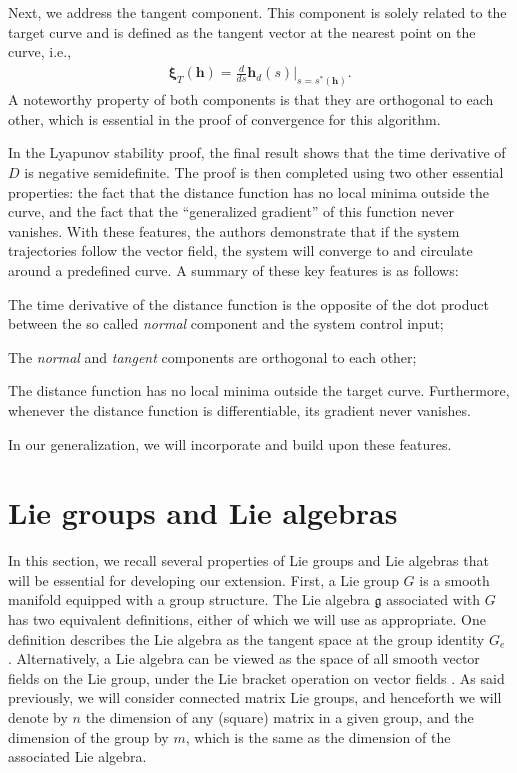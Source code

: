 Next, we address the tangent component. This component is solely related to the target curve and is defined as the tangent vector at the nearest point on the curve, i.e.,
\begin{align}
    \boldsymbol{\xi}_{T}(\mathbf{h}) = \frac{d}{ds}\mathbf{h}_d(s)|_{s=s^*(\mathbf{h})}.
\end{align}
A noteworthy property of both components is that they are orthogonal to each other, which is essential in the proof of convergence for this algorithm.

In the Lyapunov stability proof, the final result shows that the time derivative of $D$ is negative semidefinite. The proof is then completed using two other essential properties: the fact that the distance function has no local minima outside the curve, and the fact that the ``generalized gradient'' of this function never vanishes. With these features, the authors demonstrate that if the system trajectories follow the vector field, the system will converge to and circulate around a predefined curve. A summary of these key features is as follows:
\begin{feature}
    \item The time derivative of the distance function is the opposite of the dot product between the so called \emph{normal} component and the system control input; \label{feat:adriano-time-derivative-lyapunov-normal-comp}
    \item The \emph{normal} and \emph{tangent} components are orthogonal to each other; \label{feat:adriano-orthogonality}
    \item The distance function has no local minima outside the target curve. Furthermore, whenever the distance function is differentiable, its gradient never vanishes. \label{feat:adriano-no-local-minima}
\end{feature}
In our generalization, we will incorporate and build upon these features.

\section{Lie groups and Lie algebras}
In this section, we recall several properties of Lie groups and Lie algebras that will be essential for developing our extension. First, a Lie group $G$ is a smooth manifold equipped with a group structure. The Lie algebra $\mathfrak{g}$ associated with $G$ has two equivalent definitions, either of which we will use as appropriate. One definition describes the Lie algebra as the tangent space at the group identity $G_e$ \citep[p. 16]{Gallier2020}. Alternatively, a Lie algebra can be viewed as the space of all smooth vector fields on the Lie group, under the Lie bracket operation on vector fields \citep[p. 190]{Lee2012}. As said previously, we will consider connected matrix Lie groups, and henceforth we will denote by $n$ the dimension of any (square) matrix in a given group, and the dimension of the group by $m$, which is the same as the dimension of the associated Lie algebra.

